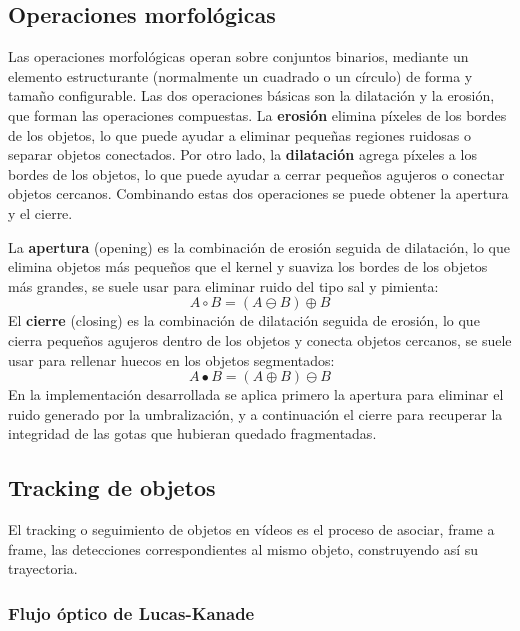 \subsection{Operaciones morfológicas}

Las operaciones morfológicas \cite{gonzalez2018digital} operan sobre conjuntos binarios, mediante un elemento estructurante (normalmente un cuadrado o un círculo) de forma y tamaño configurable. Las dos operaciones básicas son la dilatación y la erosión, que forman las operaciones compuestas. La \textbf{erosión} elimina píxeles de los bordes de los objetos, lo que puede ayudar a eliminar pequeñas regiones ruidosas o separar objetos conectados. Por otro lado, la \textbf{dilatación} agrega píxeles a los bordes de los objetos, lo que puede ayudar a cerrar pequeños agujeros o conectar objetos cercanos. Combinando estas dos operaciones se puede obtener la apertura y el cierre.

La \textbf{apertura} (opening) es la combinación de erosión seguida de dilatación, lo que elimina objetos más pequeños que el kernel y suaviza los bordes de los objetos más grandes, se suele usar para eliminar ruido del tipo sal y pimienta:
\begin{equation}
 A \circ B = (A \ominus B) \oplus B 
\end{equation}
El \textbf{cierre} (closing) es la combinación de dilatación seguida de erosión, lo que cierra pequeños agujeros dentro de los objetos y conecta objetos cercanos, se suele usar para rellenar huecos en los objetos segmentados:
\begin{equation}
 A \bullet B = (A \oplus B) \ominus B 
\end{equation}
En la implementación desarrollada se aplica primero la apertura para eliminar el ruido generado por la umbralización, y a continuación el cierre para recuperar la integridad de las gotas que hubieran quedado fragmentadas.

\subsection{Tracking de objetos}

El tracking o seguimiento de objetos en vídeos es el proceso de asociar, frame a frame, las detecciones correspondientes al mismo objeto, construyendo así su trayectoria.

\subsubsection{Flujo óptico de Lucas-Kanade}

